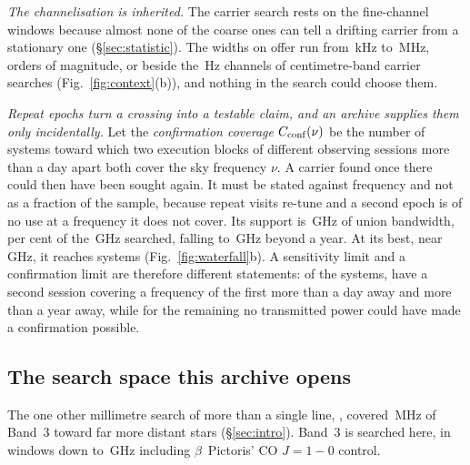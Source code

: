 \emph{The channelisation is inherited.} The carrier search rests on the
\NWinA{} fine-channel windows because almost none of the \NWinB{} coarse ones
can tell a drifting carrier from a stationary one (\S\ref{sec:statistic}). The
widths on offer run from \SzChanFinestKHz\,kHz to \SzChanWidestMHz\,MHz,
\SzChanDexSurvey{} orders of magnitude, or \SzChanDexAll{} beside the
\SzChanLitHz\,Hz channels of centimetre-band carrier searches
(Fig.~\ref{fig:context}(b)), and nothing in the search could choose them.

\emph{Repeat epochs turn a crossing into a testable claim, and an archive
supplies them only incidentally.} Let the \emph{confirmation coverage} $C_{\rm
conf}(\nu)$ be the number of systems toward which two execution blocks of
different observing sessions more than a day apart both cover the sky frequency
$\nu$. A carrier found once there could then have been sought again. It must
be stated against frequency and not as a fraction of the sample, because repeat
visits re-tune and a second epoch is of no use at a frequency it does not
cover. Its support is \CvConfGHzDay\,GHz of union bandwidth, \CvConfPctDay{}
per cent of the \CvUnionA\,GHz searched, falling to \CvConfGHzYr\,GHz beyond a
year. At its best, near \CvConfNuMaxDay\,GHz, it reaches \CvConfNMaxDay{}
systems (Fig.~\ref{fig:waterfall}b). A sensitivity limit and a confirmation limit
are therefore different statements: of the \NSysClassA{} systems,
\ZcConfSysDay{} have a second session covering a frequency of the first more
than a day away and \ZcConfSysYr{} more than a year away, while for the
remaining \ZcNoRepSys{} no transmitted power could have made a confirmation
possible.


\subsection{The search space this archive opens}
\label{sec:newspace}

The one other millimetre search of more than a single line, \citet{Mason2025},
covered \MasonBandMHz\,MHz of Band~3 toward far more distant stars
(\S\ref{sec:intro}). Band~3 is searched here, in \NWinBandThree{} windows down
to \SurvFreqLo\,GHz including $\beta$~Pictoris' CO $J=1\!-\!0$ control.

